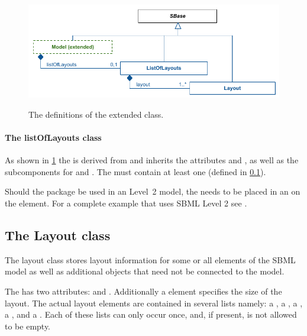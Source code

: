 \begin{figure}[!h]
\includegraphics{uml/layout-extended-model-uml}\\
\caption{The definitions of the extended \Model class.}
\label{figure:extendedmodel}
\end{figure}

\paragraph{The listOfLayouts class}
\label{listoflayouts-class}
As shown in \ref{figure:extendedmodel} the \ListOfLayouts is derived from 
\SBase and inherits the attributes  and , 
as well as the subcomponents for \Annotation and \Notes. The 
\ListOfLayouts must contain at least one \Layout (defined in 
\ref{layout-class}). 

Should the \Layout package be used in an \SBML Level~2 model, the 
\ListOfLayouts needs to be placed in an \Annotation on the \Model element. 
For a complete example that uses SBML Level 2 see .

\subsection{The Layout class}
\label{layout-class}
The layout class stores layout information for some or all elements of 
the SBML model as well as additional objects that need not be connected 
to the model. 

The \LayoutClass has two attributes:  and 
. Additionally a \Dimensions element specifies the size of 
the layout. The actual layout elements are contained in several lists 
namely: a \ListOfCompartmentGlyphs, a \ListOfSpeciesGlyphs, a 
\ListOfReactionGlyphs, a \ListOfTextGlyphs, and a 
\ListOfAdditionalGraphicalObjects. Each of these lists can only occur 
once, and, if present, is not allowed to be empty. 



